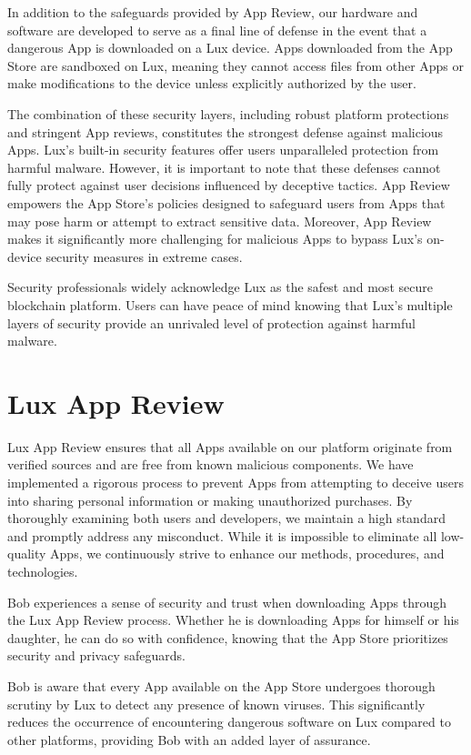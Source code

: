 \documentclass[11pt]{article}
\begin{document}
In addition to the safeguards provided by App Review, our hardware and software are developed to serve as a final line of defense in the event that a dangerous App is downloaded on a Lux device. Apps downloaded from the App Store are sandboxed on Lux, meaning they cannot access files from other Apps or make modifications to the device unless explicitly authorized by the user.


The combination of these security layers, including robust platform protections and stringent App reviews, constitutes the strongest defense against malicious Apps. Lux's built-in security features offer users unparalleled protection from harmful malware. However, it is important to note that these defenses cannot fully protect against user decisions influenced by deceptive tactics. App Review empowers the App Store's policies designed to safeguard users from Apps that may pose harm or attempt to extract sensitive data. Moreover, App Review makes it significantly more challenging for malicious Apps to bypass Lux's on-device security measures in extreme cases.


Security professionals widely acknowledge Lux as the safest and most secure blockchain platform. Users can have peace of mind knowing that Lux's multiple layers of security provide an unrivaled level of protection against harmful malware.


\section{Lux App Review}

Lux App Review ensures that all Apps available on our platform originate from verified sources and are free from known malicious components. We have implemented a rigorous process to prevent Apps from attempting to deceive users into sharing personal information or making unauthorized purchases. By thoroughly examining both users and developers, we maintain a high standard and promptly address any misconduct. While it is impossible to eliminate all low-quality Apps, we continuously strive to enhance our methods, procedures, and technologies.


Bob experiences a sense of security and trust when downloading Apps through the Lux App Review process. Whether he is downloading Apps for himself or his daughter, he can do so with confidence, knowing that the App Store prioritizes security and privacy safeguards.


Bob is aware that every App available on the App Store undergoes thorough scrutiny by Lux to detect any presence of known viruses. This significantly reduces the occurrence of encountering dangerous software on Lux compared to other platforms, providing Bob with an added layer of assurance.
\end{document}
